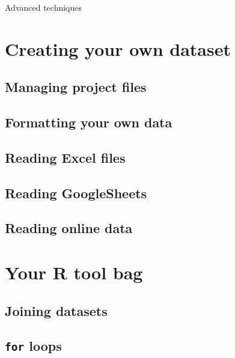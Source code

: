 \documentclass[
]{book}
\begin{document}
Advanced techniques

\hypertarget{part-creating-your-own-dataset}{%
\part{Creating your own dataset}\label{part-creating-your-own-dataset}}

\hypertarget{managing-project-files}{%
\chapter{Managing project files}\label{managing-project-files}}

\hypertarget{formatting-your-own-data}{%
\chapter{Formatting your own data}\label{formatting-your-own-data}}

\hypertarget{reading-excel-files}{%
\chapter{Reading Excel files}\label{reading-excel-files}}

\hypertarget{reading-googlesheets}{%
\chapter{Reading GoogleSheets}\label{reading-googlesheets}}

\hypertarget{reading-online-data}{%
\chapter{Reading online data}\label{reading-online-data}}

\hypertarget{part-your-r-tool-bag}{%
\part{Your R tool bag}\label{part-your-r-tool-bag}}

\hypertarget{joining-datasets}{%
\chapter{Joining datasets}\label{joining-datasets}}

\hypertarget{for-loops}{%
\chapter{\texorpdfstring{\texttt{for} loops}{for loops}}\label{for-loops}}
\end{document}
